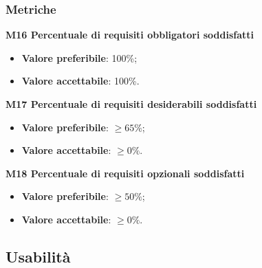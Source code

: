         \subsubsection{Metriche}
            \textbf{M16 Percentuale di requisiti obbligatori soddisfatti}
                \begin{itemize}
                    \item \textbf{Valore preferibile}: 100\%;
                    \item \textbf{Valore accettabile}: 100\%.
                \end{itemize}
            \textbf{M17 Percentuale di requisiti desiderabili soddisfatti}
            \begin{itemize}
            	\item \textbf{Valore preferibile}: $\ge65\%$;
            	\item \textbf{Valore accettabile}: $\ge0\%$.
            \end{itemize}
        	\textbf{M18 Percentuale di requisiti opzionali soddisfatti}
        	\begin{itemize}
        		\item \textbf{Valore preferibile}: $\ge50\%$;
        		\item \textbf{Valore accettabile}: $\ge0\%$.
        	\end{itemize}
    \subsection{Usabilità}
